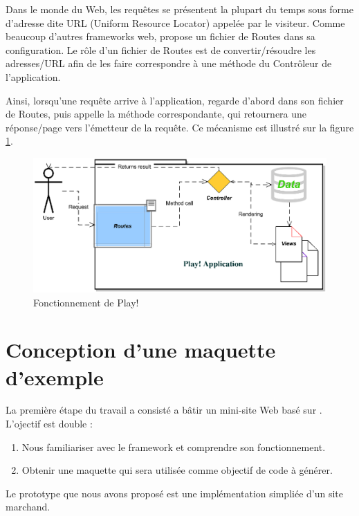 Dans le monde du Web, les requêtes se présentent la plupart du temps sous forme d'adresse dite URL (Uniform Resource Locator) appelée par le visiteur. Comme beaucoup d'autres frameworks web, \kwplay{} propose un fichier de Routes dans sa configuration. Le rôle d'un fichier de Routes est de convertir/résoudre les adresses/URL afin de les faire correspondre à une méthode du Contrôleur de l'application.

Ainsi, lorsqu'une requête arrive à l'application, \kwplay{} regarde d'abord dans son fichier de Routes, puis appelle la méthode correspondante, qui retournera une réponse/page vers l'émetteur de la requête. Ce mécanisme est illustré sur la figure \ref{fig:play_sch}.

\begin{figure}[htb]
  \centering
  \includegraphics[scale=.75]{img/play_scheme.eps}
  \caption{Fonctionnement de Play!}
  \label{fig:play_sch}
\end{figure}

\section{Conception d’une maquette d’exemple}\label{sec:pro}

La première étape du travail a consisté a bâtir un mini-site Web basé sur \kwplay{}.
\\
L'ojectif est double :
\begin{enumerate}
\item Nous familiariser avec le framework \kwplay{} et comprendre son fonctionnement.
\item Obtenir une maquette qui sera utilisée comme objectif de code à générer.
\end{enumerate}

Le prototype que nous avons proposé est une implémentation simpliée d'un site marchand. 

